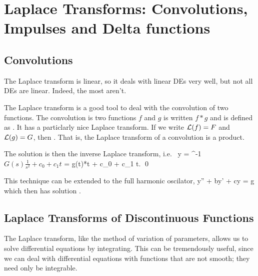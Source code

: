 \documentclass[12pt]{article}
\begin{document}
\newpage
\section{Laplace Transforms: Convolutions, Impulses and Delta functions}

\subsection{Convolutions}
The Laplace transform is linear, so it deals with linear DEs very well, but not
all DEs are linear. Indeed, the most aren't.

The Laplace transform is a good tool to deal with the convolution of two
functions. The convolution is two functions $f$ and $g$ is written $f*g$ and
is defined as
\be
{}.
\ee
It has a particlarly nice Laplace transform. If we write $\mathcal{L}(f)=F$ and
$\mathcal{L}(g)=G$, then
\be
{}.
\ee
That is, the Laplace transform of a convolution is a product.

The solution is then the inverse Laplace transform, i.e.\
\be
y = \Laplace^{-1}\(G(s)\frac{1}{s^2} + c_0 + c_1 t\)
= g(t)*t + c_0 + c_1 t. \qed
\ee

This technique can be extended to the full harmonic oscilator,
\be
y'' + by' + cy = g
\ee
which then has solution 
\be
{}.
\ee


\subsection{Laplace Transforms of Discontinuous Functions}

The Laplace transform, like the method of variation of parameters, allows us 
to solve differential equations by integrating. This can be tremendously useful,
since we can deal with differential equations with functions that are not
smooth; they need only be integrable.
\end{document}
